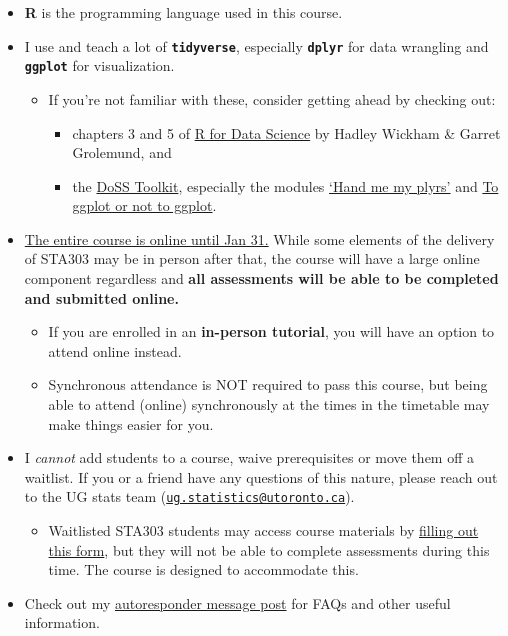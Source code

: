 \documentclass[
  openany]{book}
\providecommand{\tightlist}{%
  \setlength{\itemsep}{0pt}\setlength{\parskip}{0pt}}
\begin{document}
\begin{itemize}
\item
  \textbf{R} is the programming language used in this course.
\item
  I use and teach a lot of \textbf{\texttt{tidyverse}}, especially \textbf{\texttt{dplyr}} for data wrangling and \textbf{\texttt{ggplot}} for visualization.

  \begin{itemize}
  \item
    If you're not familiar with these, consider getting ahead by checking out:

    \begin{itemize}
    \item
      chapters 3 and 5 of \href{https://r4ds.had.co.nz/}{R for Data Science} by Hadley Wickham \& Garret Grolemund, and
    \item
      the \href{https://dosstoolkit.com/}{DoSS Toolkit}, especially the modules \href{https://dosstoolkit.com/\#hand-me-my-plyrs}{`Hand me my plyrs'} and \href{https://dosstoolkit.com/\#to-ggplot-or-not-to-ggplot}{To ggplot or not to ggplot}.
    \end{itemize}
  \end{itemize}
\item
  \href{https://www.utoronto.ca/utogether/covid-19-planning-update}{The entire course is online until Jan 31.} While some elements of the delivery of STA303 may be in person after that, the course will have a large online component regardless and \textbf{all assessments will be able to be completed and submitted online.}

  \begin{itemize}
  \item
    If you are enrolled in an \textbf{in-person tutorial}, you will have an option to attend online instead.
  \item
    Synchronous attendance is NOT required to pass this course, but being able to attend (online) synchronously at the times in the timetable may make things easier for you.
  \end{itemize}
\item
  I \emph{cannot} add students to a course, waive prerequisites or move them off a waitlist. If you or a friend have any questions of this nature, please reach out to the UG stats team (\href{mailto:ug.statistics@utoronto.ca}{\nolinkurl{ug.statistics@utoronto.ca}}).

  \begin{itemize}
  \tightlist
  \item
    Waitlisted STA303 students may access course materials by \href{https://forms.office.com/r/sKWPFFE2Cd}{filling out this form}, but they will not be able to complete assessments during this time. The course is designed to accommodate this.
  \end{itemize}
\item
  Check out my \href{https://www.lizabolton.com/autoresponder.html}{autoresponder message post} for FAQs and other useful information.
\end{itemize}
\end{document}
